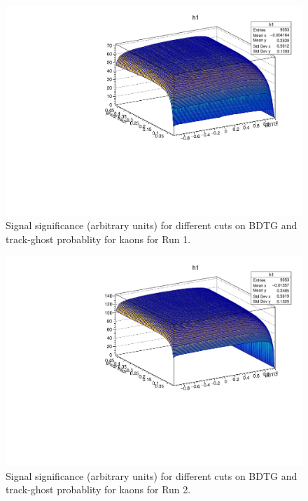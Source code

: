 \begin{figure}[!tbp]
\centering
\begin{minipage}[t]{0.6\textwidth}
\centering
\includegraphics[width=1.0\textwidth]{Figures/03_Zcs/04_Selection/significance_run1}
\end{minipage}
\caption{Signal significance (arbitrary units) for different cuts on BDTG and track-ghost probablity for kaons for Run 1.} 
\label{fig:BDTGCut_run1}
\end{figure}

\begin{figure}[!tbp]
\centering
\begin{minipage}[t]{0.6\textwidth}
\centering
\includegraphics[width=1.0\textwidth]{Figures/03_Zcs/04_Selection/significance_run2}
\end{minipage}
\caption{Signal significance (arbitrary units) for different cuts on BDTG and track-ghost probablity for kaons for Run 2.} 
\label{fig:BDTGCut_run2}
\end{figure}

